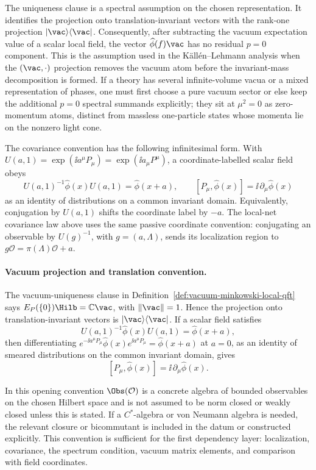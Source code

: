 The uniqueness clause is a spectral assumption on the chosen representation.
It identifies the projection onto translation-invariant vectors with the
rank-one projection
\(|\vac\rangle\langle\vac|\).  Consequently, after subtracting the vacuum
expectation value of a scalar local field, the vector
\(\widehat\phi(f)\vac\) has no residual \(p=0\) component.  This is the
assumption used in the K\"all\'en--Lehmann analysis when the
\((\vac,\cdot)\) projection removes the vacuum atom before the invariant-mass
decomposition is formed.  If a theory has several infinite-volume vacua or a
mixed representation of phases, one must first choose a pure vacuum sector or
else keep the additional \(p=0\) spectral summands explicitly; they sit at
\(\mu^2=0\) as zero-momentum atoms, distinct from massless one-particle states
whose momenta lie on the nonzero light cone.

The covariance convention has the following infinitesimal form.  With
\(U(a,1)=\exp(\ii a^\mu P_\mu)=\exp(\ii a_\mu P^\mu)\), a
coordinate-labelled scalar field obeys
\[
  U(a,1)^{-1}\widehat\phi(x)U(a,1)
  =
  \widehat\phi(x+a),
  \qquad
  [P_\mu,\widehat\phi(x)]
  =
  \ii\,\partial_\mu\widehat\phi(x)
\]
as an identity of distributions on a common invariant domain.  Equivalently,
conjugation by \(U(a,1)\) shifts the coordinate label by \(-a\).  The local-net
covariance law above uses the same passive coordinate convention: conjugating
an observable by \(U(g)^{-1}\), with \(g=(a,\Lambda)\), sends its localization
region to \(g\mathcal O=\pi(\Lambda)\mathcal O+a\).

\paragraph{Vacuum projection and translation convention.}
The vacuum-uniqueness clause in
Definition~\ref{def:vacuum-minkowski-local-qft} says
\(E_P(\{0\})\Hilb=\mathbb C\vac\), with \(\|\vac\|=1\).  Hence the projection
onto translation-invariant vectors is \(|\vac\rangle\langle\vac|\).  If a
scalar field satisfies
\[
  U(a,1)^{-1}\widehat\phi(x)U(a,1)=\widehat\phi(x+a),
\]
then differentiating
\(e^{-\ii a^\mu P_\mu}\widehat\phi(x)e^{\ii a^\mu P_\mu}=\widehat\phi(x+a)\)
at \(a=0\), as an identity of smeared distributions on the common invariant
domain, gives
\[
  [P_\mu,\widehat\phi(x)]=\ii\,\partial_\mu\widehat\phi(x).
\]

In this opening convention \(\Obs(\mathcal O)\) is a concrete algebra of
bounded observables on the chosen Hilbert space and is not assumed to be norm
closed or weakly closed unless this is stated.  If a \(C^*\)-algebra or von
Neumann algebra is needed, the relevant closure or bicommutant is included in
the datum or constructed explicitly.  This convention is sufficient for the
first dependency layer: localization, covariance, the spectrum condition,
vacuum matrix elements, and comparison with field coordinates.


